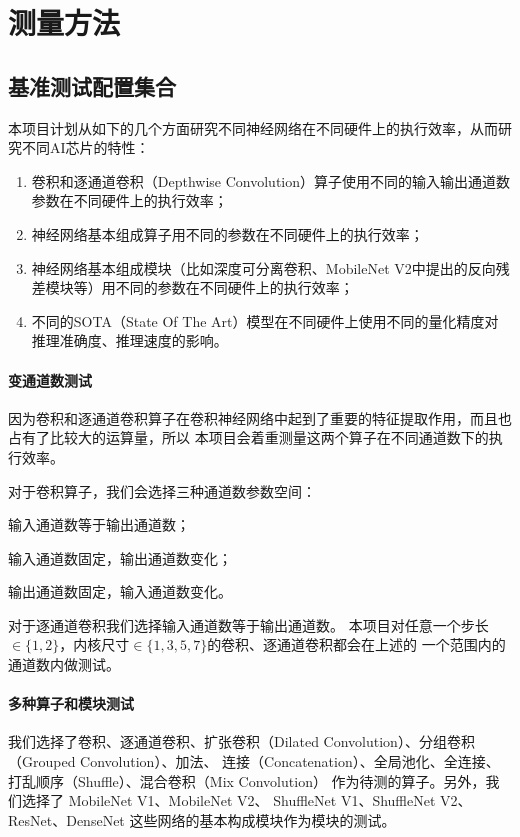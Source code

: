 \section{测量方法}
\subsection{基准测试配置集合}
本项目计划从如下的几个方面研究不同神经网络在不同硬件上的执行效率，从而研究不同AI芯片的特性：
\begin{enumerate}
    \item 卷积和逐通道卷积（Depthwise Convolution）算子使用不同的输入输出通道数参数在不同硬件上的执行效率；
    \item 神经网络基本组成算子用不同的参数在不同硬件上的执行效率；
    \item 神经网络基本组成模块（比如深度可分离卷积、MobileNet V2中提出的反向残差模块等）用不同的参数在不同硬件上的执行效率；
    \item 不同的SOTA（State Of The Art）模型在不同硬件上使用不同的量化精度对推理准确度、推理速度的影响。
\end{enumerate}

\paragraph{变通道数测试}
因为卷积和逐通道卷积算子在卷积神经网络中起到了重要的特征提取作用，而且也占有了比较大的运算量，所以
本项目会着重测量这两个算子在不同通道数下的执行效率。

对于卷积算子，我们会选择三种通道数参数空间：
\begin{enumerate*}
    \item 输入通道数等于输出通道数；
    \item 输入通道数固定，输出通道数变化；
    \item 输出通道数固定，输入通道数变化。
\end{enumerate*}
对于逐通道卷积我们选择输入通道数等于输出通道数。
本项目对任意一个步长$\in \{1,2\}$，内核尺寸$\in \{1,3,5,7\}$的卷积、逐通道卷积都会在上述的
一个范围内的通道数内做测试。

\paragraph{多种算子和模块测试}
我们选择了卷积、逐通道卷积、扩张卷积（Dilated Convolution）、分组卷积（Grouped Convolution）、加法、
连接（Concatenation）、全局池化、全连接、打乱顺序（Shuffle）、混合卷积（Mix Convolution\cite{tan2019mixconv}）
作为待测的算子。另外，我们选择了
MobileNet V1\cite{howard2017mobilenets}、MobileNet V2\cite{sandler2018mobilenetv2}、
ShuffleNet V1\cite{zhang2018shufflenet}、ShuffleNet V2\cite{ma2018shufflenet}、
ResNet\cite{he2016deep}、DenseNet\cite{huang2017densely}
这些网络的基本构成模块作为模块的测试。

